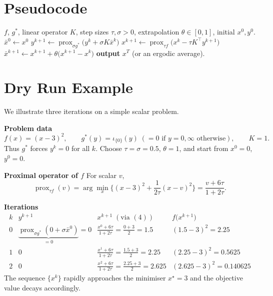 \documentclass{article}
\newcommand{\prox}{\operatorname{prox}}
\begin{document}
\section*{Pseudocode}
\begin{algorithm}[H]
\caption{PDHG for \eqref{1}}
\begin{algorithmic}[1]
\Require $f$, $g^{*}$, linear operator $K$, step sizes $\tau,\sigma>0$, extrapolation $\theta\in[0,1]$, initial $x^{0},y^{0}$.
\State $\bar x^{0}\gets x^{0}$
    \State $y^{k+1}\gets\prox_{\sigma g^{*}}\!\big(y^{k}+\sigma K\bar x^{k}\big)$ \hfill{}
    \State $x^{k+1}\gets\prox_{\tau f}\!\big(x^{k}-\tau K^{\top}y^{k+1}\big)$ \hfill{}
    \State $\bar x^{k+1}\gets x^{k+1}+\theta\big(x^{k+1}-x^{k}\big)$
\EndFor
\State \textbf{output} $x^{T}$ (or an ergodic average).
\end{algorithmic}
\end{algorithm}

\section*{Dry Run Example}
We illustrate three iterations on a simple scalar problem.  

\medskip
\noindent\textbf{Problem data}
\[
f(x)=(x-3)^{2},\qquad g^{*}(y)=\iota_{\{0\}}(y)\;(=0\text{ if }y=0,\infty\text{ otherwise}),\qquad K=1.
\]
Thus $g^{*}$ forces $y^{k}=0$ for all $k$.  
Choose $\tau=\sigma=0.5$, $\theta=1$, and start from $x^{0}=0$, $y^{0}=0$.

\medskip
\noindent\textbf{Proximal operator of $f$}
For scalar $v$,
\[
\prox_{\tau f}(v)=\arg\min_{x}\Big\{(x-3)^{2}+\frac{1}{2\tau}(x-v)^{2}\Big\}
          =\frac{v+6\tau}{1+2\tau}.
\tag{4}
\]

\medskip
\noindent\textbf{Iterations}
\[
\begin{array}{c|c|c|c}
k & y^{k+1} & x^{k+1}\;(\text{via }(4)) & f\big(x^{k+1}\big) \\ \hline
0 &
\underbrace{\prox_{\sigma g^{*}}(0+\sigma\bar x^{0})}_{=0}=0 &
\frac{x^{0}+6\tau}{1+2\tau}
   =\frac{0+3}{2}=1.5 &
(1.5-3)^{2}=2.25 \\[4pt]
1 &
0 &
\frac{x^{1}+6\tau}{1+2\tau}
   =\frac{1.5+3}{2}=2.25 &
(2.25-3)^{2}=0.5625 \\[4pt]
2 &
0 &
\frac{x^{2}+6\tau}{1+2\tau}
   =\frac{2.25+3}{2}=2.625 &
(2.625-3)^{2}=0.140625
\end{array}
\]
The sequence $\{x^{k}\}$ rapidly approaches the minimiser $x^{\star}=3$ and the objective value decays accordingly.
\end{document}

